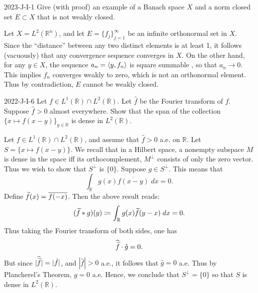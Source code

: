 \documentclass{article}
\begin{document}
	
	\begin{prb}{2023-J-I-1}
		Give (with proof) an example of a Banach space $X$ and a norm closed set $E \subset X$ that is not weakly closed. 
	\end{prb}
	Let $X = L^{2}(\mathbb{R}^{n})$, and let $E = \{f_{j}\}_{j = 1}^{\infty}$ be an infinite orthonormal set in $X$. Since the ``distance'' between any two distinct elements is at least 1, it follows (vacuously) that any convergence sequence converges in $X$. On the other hand, for any $y \in X$, the sequence $a_{n} = \braket{y, f_{n}}$ is square summable , so that $a_{n} \to 0$. This implies $f_{n}$ converges weakly to zero, which is not an orthonormal element. Thus by contradiction, $E$ cannot be weakly closed.
	
	\begin{prb}{2022-J-I-6}
		Let $f \in L^{1}(\mathbb{R}) \cap L^2(\mathbb{R})$. Let $\hat{f}$ be the Fourier transform of $f$. Suppose $\hat{f} > 0$ almost everywhere. Show that the span of the collection $\{x \mapsto f(x - y)\}_{y \in \mathbb{R}}$ is dense in $L^2(\mathbb{R})$. 
	\end{prb} 
	Let $f \in L^1(\mathbb{R}) \cap L^{2}(\mathbb{R})$, and assume that $\hat{f} > 0$ a.e. on $\mathbb{R}$. Let $S = \{x \mapsto f(x - y)\}$. We recall that in a Hilbert space, a nonempty subspace $M$ is dense in the space iff its orthocomplement, $M^{\perp}$ consists of only the zero vector. Thus we wish to show that $S^{\perp}$ is $\{0\}$. Suppose $g \in S^{\perp}$. This means that 
	\begin{equation*}
		\int_{\mathbb{R}}g(x)\overline{f(x -y)}\;dx = 0. 
	\end{equation*}
	Define $\widetilde{f}(x) = \overline{f(-x)}$. Then the above result reads: 
	\begin{equation*}
		(\widetilde{f} \ast g)(y) \coloneqq \int_{\mathbb{R}}g(x)\widetilde{f}(y -x)\;dx = 0. 
	\end{equation*}
	Thus taking the Fourier transform of both sides, one has 
	\begin{equation*}
		\widehat{\widetilde{f}} \cdot \hat{g} = 0. 
	\end{equation*}
	But since $|\widehat{\widetilde{f}}| = |\hat{f}|$, and $|\hat{f}| > 0$ a.e., it follows that $\hat{g} = 0$ a.e. Thus by Plancherel's Theorem, $g = 0$ a.e. Hence, we conclude that $S^{\perp} = \{0\}$ so that $S$ is dense in $L^2(\mathbb{R})$. 
	
\end{document}
